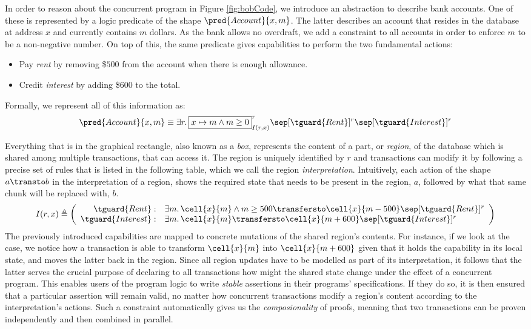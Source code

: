 In order to reason about the concurrent program in Figure \ref{fig:bobCode}, we introduce an abstraction to describe bank accounts. One of these is represented by a logic predicate of the shape $\pred{Account}{x, m}$. The latter describes an account that resides in the database at address $x$ and currently contains $m$ dollars. As the bank allows no overdraft, we add a constraint to all accounts in order to enforce $m$ to be a non-negative number. On top of this, the same predicate gives capabilities to perform the two fundamental actions:
\begin{itemize}
	\item Pay \textit{rent} by removing \$$500$ from the account when there is enough allowance.
	
	\item Credit \textit{interest} by adding \$$600$ to the total.
\end{itemize}
Formally, we represent all of this information as:
\[
	\pred{Account}{x, m}
		\equiv
	\exists r \ldotp \boxed{x \mapsto m \land m \geq 0}^r_{I(r, x)}
	\sep [\tguard{Rent}]^r \sep [\tguard{Interest}]^r
\]

Everything that is in the graphical rectangle, also known as a \textit{box}, represents the content of a part, or \textit{region}, of the database which is shared among multiple transactions, that can access it. The region is uniquely identified by $r$ and transactions can modify it by following a precise set of rules that is listed in the following table, which we call the region \textit{interpretation}. Intuitively, each action of the shape $a \transto b$ in the interpretation of a region, shows the required state that needs to be present in the region, $a$, followed by what that same chunk will be replaced with, $b$.
\[
	I(r, x) \triangleq \left( 
		\begin{array}{r l}
			\tguard{Rent}:
				&
			\exists m \ldotp \cell{x}{m} \land m \geq 500 \transfersto \cell{x}{m - 500} \sep [\tguard{Rent}]^r
			\\
			\tguard{Interest}:
				&
			\exists m \ldotp \cell{x}{m} \transfersto \cell{x}{m + 600} \sep [\tguard{Interest}]^r
		\end{array}
	 \right)
\]
The previously introduced capabilities are mapped to concrete mutations of the shared region's contents. For instance, if we look at the  case, we notice how a transaction is able to transform $\cell{x}{m}$ into $\cell{x}{m + 600}$ given that it holds the capability in its local state, and moves the latter back in the region. Since all region updates have to be modelled as part of its interpretation, it follows that the latter serves the crucial purpose of declaring to all transactions how might the shared state change under the effect of a concurrent program. This enables users of the program logic to write \textit{stable} assertions in their programs' specifications. If they do so, it is then ensured that a particular assertion will remain valid, no matter how concurrent transactions modify a region's content according to the interpretation's actions. Such a constraint automatically gives us the \textit{composionality} of proofs, meaning that two transactions can be proven independently and then combined in parallel.

